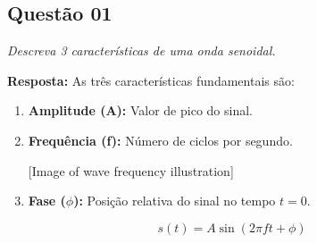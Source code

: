 \subsection*{Questão 01}

\textit{Descreva 3 características de uma onda senoidal.}

\textbf{Resposta:}
As três características fundamentais são:
\begin{enumerate}
    \item \textbf{Amplitude (A):} Valor de pico do sinal.
    \item \textbf{Frequência (f):} Número de ciclos por segundo. 

[Image of wave frequency illustration]

    \item \textbf{Fase ($\phi$):} Posição relativa do sinal no tempo $t=0$.
\end{enumerate}

\begin{equation}
    s(t) = A \sin(2\pi ft + \phi)
\end{equation}